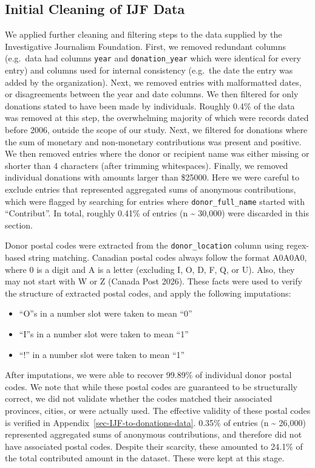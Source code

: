 \documentclass[
  letterpaper,
  DIV=11,
  numbers=noendperiod]{scrartcl}
\providecommand{\tightlist}{%
  \setlength{\itemsep}{0pt}\setlength{\parskip}{0pt}}
\begin{document}
\subsection{Initial Cleaning of IJF Data}\label{sec-cleaning-IJF}

We applied further cleaning and filtering steps to the data supplied by
the Investigative Journalism Foundation. First, we removed redundant
columns (e.g.~data had columns \texttt{year} and \texttt{donation\_year}
which were identical for every entry) and columns used for internal
consistency (e.g.~the date the entry was added by the organization).
Next, we removed entries with malformatted dates, or disagreements
between the year and date columns. We then filtered for only donations
stated to have been made by individuals. Roughly 0.4\% of the data was
removed at this step, the overwhelming majority of which were records
dated before 2006, outside the scope of our study. Next, we filtered for
donations where the sum of monetary and non-monetary contributions was
present and positive. We then removed entries where the donor or
recipient name was either missing or shorter than 4 characters (after
trimming whitespaces). Finally, we removed individual donations with
amounts larger than \$25000. Here we were careful to exclude entries
that represented aggregated sums of anonymous contributions, which were
flagged by searching for entries where \texttt{donor\_full\_name}
started with ``Contribut''. In total, roughly 0.41\% of entries (n
\textasciitilde{} 30,000) were discarded in this section.

Donor postal codes were extracted from the \texttt{donor\_location}
column using regex-based string matching. Canadian postal codes always
follow the format A0A0A0, where 0 is a digit and A is a letter
(excluding I, O, D, F, Q, or U). Also, they may not start with W or Z
(Canada Post 2026). These facts were used to verify the structure of
extracted postal codes, and apply the following imputations:

\begin{itemize}
\tightlist
\item
  ``O''s in a number slot were taken to mean ``0''
\item
  ``I''s in a number slot were taken to mean ``1''
\item
  ``!'' in a number slot were taken to mean ``1''
\end{itemize}

After imputations, we were able to recover 99.89\% of individual donor
postal codes. We note that while these postal codes are guaranteed to be
structurally correct, we did not validate whether the codes matched
their associated provinces, cities, or were actually used. The effective
validity of these postal codes is verified in
Appendix~\ref{sec-IJF-to-donations-data}. 0.35\% of entries (n
\textasciitilde{} 26,000) represented aggregated sums of anonymous
contributions, and therefore did not have associated postal codes.
Despite their scarcity, these amounted to 24.1\% of the total
contributed amount in the dataset. These were kept at this stage.
\end{document}
